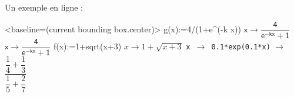 \documentclass[french,a4paper,11pt]{article}
\begin{document}
\begin{PresentationCode}{}
Un exemple en ligne :~
\begin{CalculFormelXcas}%
		[Largeur=10,TexteOptions={Config : exact cpxl RAD 12 xcas}]%
		<baseline=(current bounding box.center)>
	\LigneCalculsXcas%
		{\sffamily g(x):=4/(1+e\textasciicircum(-k x))}
		{$\mathsf{x \rightarrow \dfrac{4}{e^{-kx}+1}}$}
		{$\mathsf{x \rightarrow \dfrac{4}{e^{-kx}+1}}$}
	\LigneCalculsXcas
		{f(x):=1+sqrt(x+3)}
		{$x \rightarrow 1+\sqrt{x+3}$}
		{\texttt{x $\rightarrow$ 0.1*exp(0.1*x)}}
		{$\rightarrow$ \: $\dfrac{\dfrac14+\dfrac13}{\dfrac15+\dfrac27}$}
	\end{CalculFormelXcas}
\end{PresentationCode}
\end{document}
